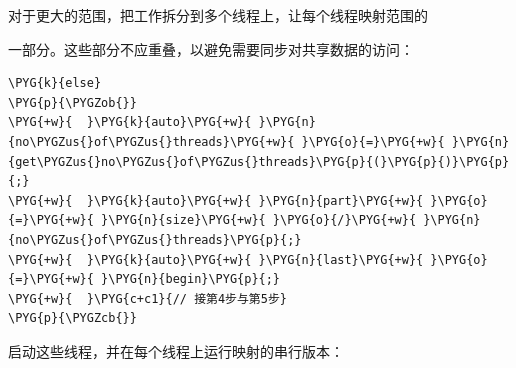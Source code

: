 
对于更大的范围，把工作拆分到多个线程上，让每个线程映射范围的



一部分。这些部分不应重叠，以避免需要同步对共享数据的访问：



\begin{codeblockbg}
\begin{Verbatim}[commandchars=\\\{\},breaklines=true,breakanywhere=true,fontsize=\codefont,xleftmargin=17bp]
\PYG{k}{else}
\PYG{p}{\PYGZob{}}
\PYG{+w}{  }\PYG{k}{auto}\PYG{+w}{ }\PYG{n}{no\PYGZus{}of\PYGZus{}threads}\PYG{+w}{ }\PYG{o}{=}\PYG{+w}{ }\PYG{n}{get\PYGZus{}no\PYGZus{}of\PYGZus{}threads}\PYG{p}{(}\PYG{p}{)}\PYG{p}{;}
\PYG{+w}{  }\PYG{k}{auto}\PYG{+w}{ }\PYG{n}{part}\PYG{+w}{ }\PYG{o}{=}\PYG{+w}{ }\PYG{n}{size}\PYG{+w}{ }\PYG{o}{/}\PYG{+w}{ }\PYG{n}{no\PYGZus{}of\PYGZus{}threads}\PYG{p}{;}
\PYG{+w}{  }\PYG{k}{auto}\PYG{+w}{ }\PYG{n}{last}\PYG{+w}{ }\PYG{o}{=}\PYG{+w}{ }\PYG{n}{begin}\PYG{p}{;}
\PYG{+w}{  }\PYG{c+c1}{// 接第4步与第5步}
\PYG{p}{\PYGZcb{}}
\end{Verbatim}
\end{codeblockbg}



启动这些线程，并在每个线程上运行映射的串行版本：



